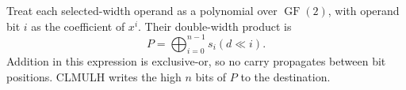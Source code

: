 Treat each selected-width operand as a polynomial over \(\operatorname{GF}(2)\), with operand bit \(i\) as the coefficient of \(x^i\). Their double-width product is
\[
  P = \bigoplus_{i=0}^{n-1} s_i (d \ll i) .
\]
Addition in this expression is exclusive-or, so no carry propagates between bit positions. CLMULH writes the high \(n\) bits of \(P\) to the destination.
